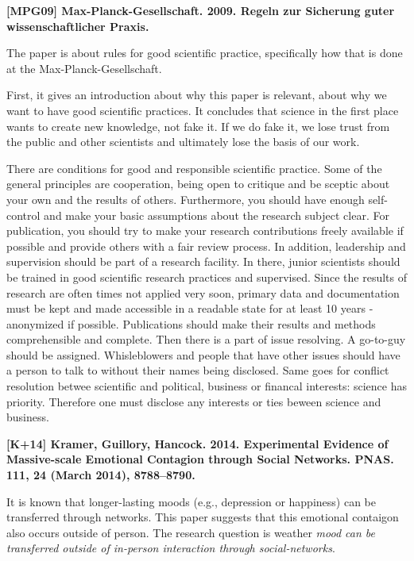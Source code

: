 \documentclass[a4paper,12pt,english]{scrartcl}
\newcommand{\papertitle}[2]{
    \noindent
    \textbf{\textsf{{\large
        [#1] #2
    }}}
    \vspace{2mm}
}
\begin{document}
\pagestyle{fancy} %

\papertitle{MPG09}{Max-Planck-Gesellschaft. 2009. Regeln zur Sicherung guter
                   wissenschaftlicher Praxis.}

The paper is about rules for good scientific practice, specifically how that is
done at the Max-Planck-Gesellschaft.

First, it gives an introduction about why this paper is relevant, about why we
want to have good scientific practices. It concludes that science in the first
place wants to create new knowledge, not fake it. If we do fake it, we lose
trust from the public and other scientists and ultimately lose the basis of our
work.

There are conditions for good and responsible scientific practice. Some of the
general principles are cooperation, being open to critique and be sceptic about
your own and the results of others. Furthermore, you should have enough
self-control and make your basic assumptions about the research subject clear.
For publication, you should try to make your research contributions freely
available if possible and provide others with a fair review process.
In addition, leadership and supervision should be part of a research facility.
In there, junior scientists should be trained in good scientific research
practices and supervised.
Since the results of research are often times not applied very soon, primary
data and documentation must be kept and made accessible in a readable state for
at least 10 years - anonymized if possible. Publications should make their
results and methods comprehensible and complete.
Then there is a part of issue resolving. A go-to-guy should be assigned.
Whisleblowers and people that have other issues should have a person to talk to
without their names being disclosed.
Same goes for conflict resolution betwee scientific and political, business or
financal interests: science has priority. Therefore one must disclose any
interests or ties beween science and business.

\vspace{8mm}

\papertitle{K+14}{Kramer, Guillory, Hancock. 2014. Experimental Evidence of
                  Massive-scale Emotional Contagion through Social Networks.
                  PNAS. 111, 24 (March 2014), 8788–8790.}

It is known that longer-lasting moods (e.g., depression or happiness) can be
transferred through networks. This paper suggests that this emotional contaigon
also occurs outside of person. The research question is weather \textit{mood can
be transferred outside of in-person interaction through social-networks}.
\end{document}
